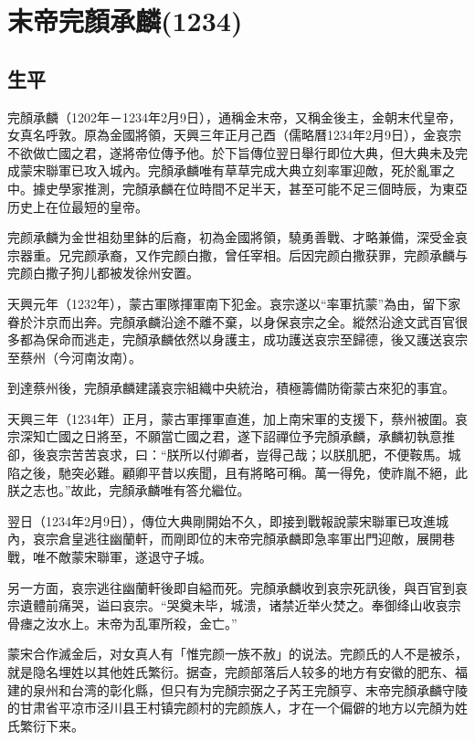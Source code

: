 
\section{末帝完顏承麟\tiny(1234)}

\subsection{生平}

完顏承麟（1202年－1234年2月9日），通稱金末帝，又稱金後主，金朝末代皇帝，女真名呼敦。原為金國將領，天興三年正月己酉（儒略曆1234年2月9日），金哀宗不欲做亡國之君，遂將帝位傳予他。於下旨傳位翌日舉行即位大典，但大典未及完成蒙宋聯軍已攻入城內。完顏承麟唯有草草完成大典立刻率軍迎敵，死於亂軍之中。據史學家推測，完顏承麟在位時間不足半天，甚至可能不足三個時辰，为東亞历史上在位最短的皇帝。

完颜承麟为金世祖劾里鉢的后裔，初為金國將領，驍勇善戰、才略兼備，深受金哀宗器重。兄完颜承裔，又作完颜白撒，曾任宰相。后因完颜白撒获罪，完颜承麟与完颜白撒子狗儿都被发徐州安置。

天興元年（1232年），蒙古軍隊揮軍南下犯金。哀宗遂以“率軍抗蒙”為由，留下家眷於汴京而出奔。完顏承麟沿途不離不棄，以身保哀宗之全。縱然沿途文武百官很多都為保命而逃走，完顏承麟依然以身護主，成功護送哀宗至歸德，後又護送哀宗至蔡州（今河南汝南）。

到達蔡州後，完顏承麟建議哀宗組織中央統治，積極籌備防衛蒙古來犯的事宜。

天興三年（1234年）正月，蒙古軍揮軍直進，加上南宋軍的支援下，蔡州被圍。哀宗深知亡國之日將至，不願當亡國之君，遂下詔禪位予完顏承麟，承麟初執意推卻，後哀宗苦苦哀求，曰：“朕所以付卿者，豈得己哉；以朕肌肥，不便鞍馬。城陷之後，馳突必難。顧卿平昔以疾聞，且有將略可稱。萬一得免，使祚胤不絕，此朕之志也。”故此，完顏承麟唯有答允繼位。

翌日（1234年2月9日），傳位大典剛開始不久，即接到戰報說蒙宋聯軍已攻進城內，哀宗倉皇逃往幽蘭軒，而剛即位的末帝完顏承麟即急率軍出門迎敵，展開巷戰，唯不敵蒙宋聯軍，遂退守子城。

另一方面，哀宗逃往幽蘭軒後即自縊而死。完顏承麟收到哀宗死訊後，與百官到哀宗遺體前痛哭，谥曰哀宗。“哭奠未毕，城溃，诸禁近举火焚之。奉御绛山收哀宗骨瘗之汝水上。末帝为乱軍所殺，金亡。”

蒙宋合作滅金后，对女真人有「惟完颜一族不赦」的说法。完颜氏的人不是被杀，就是隐名埋姓以其他姓氏繁衍。据查，完颜部落后人较多的地方有安徽的肥东、福建的泉州和台湾的彰化縣，但只有为完顏宗弼之子芮王完顏亨、末帝完顏承麟守陵的甘肃省平凉市泾川县王村镇完颜村的完颜族人，才在一个偏僻的地方以完顏为姓氏繁衍下来。

